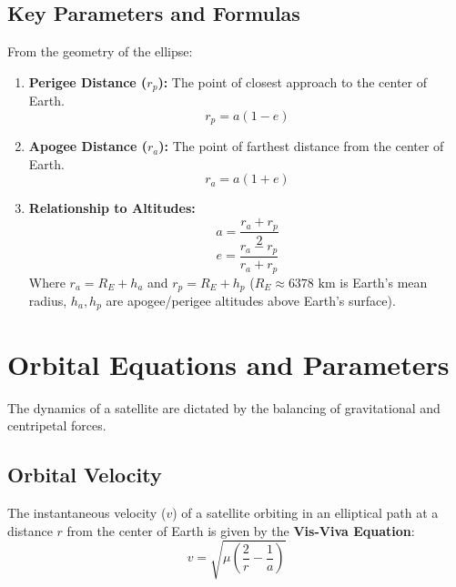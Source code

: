 \documentclass[12pt,a4paper]{article}
\begin{document}
\subsection{Key Parameters and Formulas}
From the geometry of the ellipse:
\begin{enumerate}[label=\textbf{\arabic*.}, leftmargin=*, itemsep=3pt]
  \item \textbf{Perigee Distance ($r_p$):} The point of closest approach to the center of Earth.
    \begin{equation}
      r_p = a(1 - e)
    \end{equation}
  \item \textbf{Apogee Distance ($r_a$):} The point of farthest distance from the center of Earth.
    \begin{equation}
      r_a = a(1 + e)
    \end{equation}
  \item \textbf{Relationship to Altitudes:}
    \begin{equation}
      a = \frac{r_a + r_p}{2}
    \end{equation}
    \begin{equation}
      e = \frac{r_a - r_p}{r_a + r_p}
    \end{equation}
    Where $r_a = R_E + h_a$ and $r_p = R_E + h_p$ ($R_E \approx 6378 \text{ km}$ is Earth's mean radius, $h_a, h_p$ are apogee/perigee altitudes above Earth's surface).
\end{enumerate}

\section{Orbital Equations and Parameters}

The dynamics of a satellite are dictated by the balancing of gravitational and centripetal forces.

\subsection{Orbital Velocity}
The instantaneous velocity ($v$) of a satellite orbiting in an elliptical path at a distance $r$ from the center of Earth is given by the \textbf{Vis-Viva Equation}:
\begin{equation}
  v = \sqrt{\mu \left( \frac{2}{r} - \frac{1}{a} \right)}
\end{equation}
\end{document}
